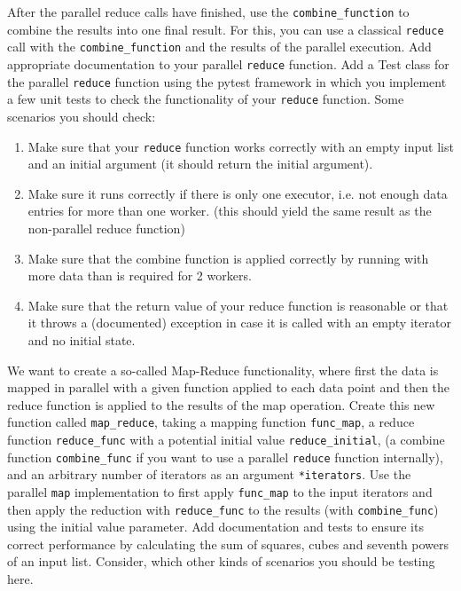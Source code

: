 \documentclass[]{erlangen-problemset}
\begin{document}
\begin{problem}[title={Parallel operators}]
After the parallel reduce calls have finished, use the \texttt{combine\_function} to combine the results into one final result. 
For this, you can use a classical \texttt{reduce} call with the \texttt{combine\_function} and the results of the parallel execution.
Add appropriate documentation to your parallel \texttt{reduce} function.
\Question Add a Test class for the parallel \texttt{reduce} function using the pytest framework in which you implement a few unit tests to check the functionality of your \texttt{reduce} function. 
Some scenarios you should check:
\begin{enumerate}
    \item Make sure that your \texttt{reduce} function works correctly with an empty input list and an initial argument (it should return the initial argument).
    \item Make sure it runs correctly if there is only one executor, i.e. not enough data entries for more than one worker. (this should yield the same result as the non-parallel reduce function)
    \item Make sure that the combine function is applied correctly by running with more data than is required for 2 workers.
    \item Make sure that the return value of your reduce function is reasonable or that it throws a (documented) exception in case it is called with an empty iterator and no initial state.
\end{enumerate}
\Question We want to create a so-called Map-Reduce functionality, where first the data is mapped in parallel with a given function applied to each data point and then the reduce function is applied to the results of the map operation. 
Create this new function called \texttt{map\_reduce}, taking a mapping function \texttt{func\_map}, a reduce function \texttt{reduce\_func} with a potential initial value \texttt{reduce\_initial}, (a combine function \texttt{combine\_func} if you want to use a parallel \texttt{reduce} function internally), and an arbitrary number of iterators as an argument \texttt{*iterators}.
Use the parallel \texttt{map} implementation to first apply \texttt{func\_map} to the input iterators and then apply the reduction with \texttt{reduce\_func} to the results (with \texttt{combine\_func}) using the initial value parameter.
Add documentation and tests to ensure its correct performance by calculating the sum of squares, cubes and seventh powers of an input list. 
Consider, which other kinds of scenarios you should be testing here.
\end{problem}
\end{document}
